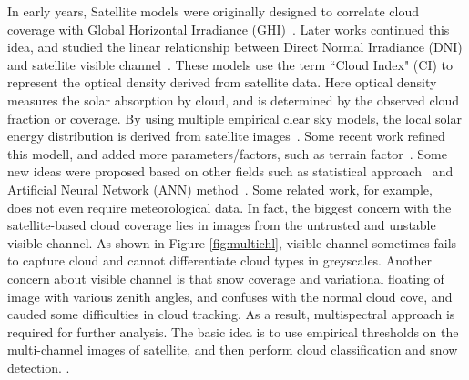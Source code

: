 \documentclass[conference]{IEEEtran}
\begin{document}
In early years, Satellite models were originally designed to correlate cloud
coverage with Global Horizontal Irradiance (GHI)~\cite{stuhlmann1990improvement,schmetz1989towards}.
Later works continued this idea, and studied the linear relationship between Direct
Normal Irradiance (DNI) and satellite visible channel~\cite{ineichen1999derivation,hammer2003solar}. 
These models use the term ``Cloud Index" (CI) to represent the optical density derived from satellite data.  Here optical density measures the solar absorption by cloud, and is determined by the observed cloud fraction or coverage.  By using multiple empirical clear sky models,
the local solar energy distribution is derived from satellite
images~\cite{janjai2005development}.  Some recent work refined this modell, and added more parameters/factors, such as terrain factor~\cite{perez2004producing}.   Some new ideas were proposed based on other fields such as statistical approach~\cite{zarzalejo2009new} and
Artificial Neural Network (ANN) method~\cite{csenkal2009estimation}.   
Some related work, for example, ~\cite{csenkal2010modeling} does not even require meteorological data.
In fact, the biggest concern with the satellite-based cloud coverage lies in images from the untrusted and unstable visible channel. As shown in Figure
\ref{fig:multichl}, visible channel sometimes fails to capture cloud and
cannot differentiate cloud types in greyscales. Another concern about
visible channel is that snow coverage and variational floating of image
with various zenith angles, and confuses with the normal cloud cove,  and cauded some difficulties in cloud tracking.  As a
result, multispectral approach is required for further analysis. The basic idea is
to use empirical thresholds on the  multi-channel images of satellite, and then perform cloud
classification and snow detection. 
\cite{perez2010improving,ricciardelli2008physical}.


 
\end{document}
